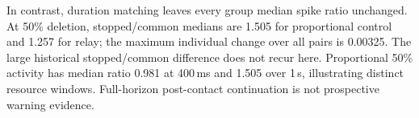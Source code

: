 In contrast, duration matching leaves every group median spike ratio unchanged. At 50\% deletion, stopped/common medians are 1.505 for proportional control and 1.257 for relay; the maximum individual change over all pairs is 0.00325. The large historical stopped/common difference does not recur here. Proportional 50\% activity has median ratio 0.981 at 400\,ms and 1.505 over 1\,s, illustrating distinct resource windows. Full-horizon post-contact continuation is not prospective warning evidence.
